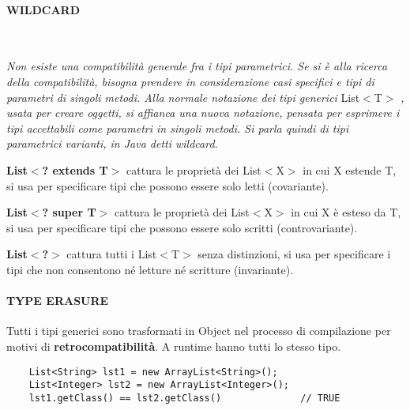 \documentclass[a4paper, 12pt]{article}
\begin{document}
\paragraph{WILDCARD} \

\textit{Non esiste una compatibilità generale fra i tipi parametrici. Se si è alla ricerca
della compatibilità, bisogna prendere in considerazione casi specifici e tipi di parametri
di singoli metodi. Alla normale notazione dei tipi generici} List$<$T$>$ \textit{, usata
per creare oggetti, si affianca una nuova notazione, pensata per esprimere i tipi
accettabili come parametri in singoli metodi.
Si parla quindi di tipi parametrici varianti, in Java detti wildcard.}

\noindent\textbf{List$<$? extends T$>$} cattura le proprietà dei List$<$X$>$ in cui X estende
T, si usa per specificare tipi che possono essere solo letti (covariante).

\noindent\textbf{List$<$? super T$>$} cattura le proprietà dei List$<$X$>$ in cui X è esteso
da T, si usa per specificare tipi che possono essere solo scritti (controvariante).

\noindent\textbf{List$<$?$>$} cattura tutti i List$<$T$>$ senza distinzioni, si usa per
specificare i tipi che non consentono né letture né scritture (invariante).

\paragraph{TYPE ERASURE} Tutti i tipi generici sono trasformati in Object nel processo di
compilazione per motivi di \textbf{retrocompatibilità}. A runtime hanno tutti lo stesso
tipo.
\begin{lstlisting}
    List<String> lst1 = new ArrayList<String>();
    List<Integer> lst2 = new ArrayList<Integer>();
    lst1.getClass() == lst2.getClass()              // TRUE
\end{lstlisting}
\end{document}
